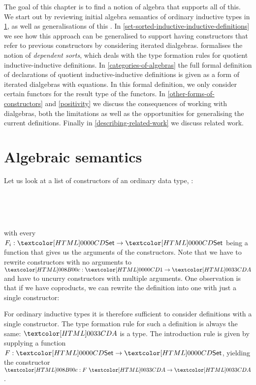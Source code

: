 The goal of this chapter is to find a notion of algebra that supports
all of this. We start out by reviewing initial algebra semantics of
ordinary inductive types in \cref{algebraic-semantics}, as well as
generalisations of this . In
\cref{set-sorted-inductive-inductive-definitions} we see how this
approach can be generalised to support having constructors that refer
to previous constructors by considering iterated
dialgebras.  formalises the notion of
\emph{dependent sorts}, which deals with the type formation rules for
quotient inductive-inductive definitions. In
\cref{categories-of-algebras} the full formal definition of
declarations of quotient inductive-inductive definitions is given as a
form of iterated dialgebras with equations. In this formal definition,
we only consider certain functors for the result type of the
functors. In \cref{other-forms-of-constructors} and \cref{positivity}
we discuss the consequences of working with dialgebras, both the
limitations as well as the opportunities for generalising the current
definitions. Finally in \cref{describing-related-work} we discuss
related work.

\section{Algebraic semantics}
\label{algebraic-semantics}

Let us look at a list of constructors of an ordinary data type, \eg:
%
\begin{datatype}{\Aty}{\Set}
   \\
   \\
  \constrdots \\
\end{datatype}
%
with every $F_i : \Set \to \Set$ being a function that gives us the
arguments of the constructors. Note that we have to rewrite
constructors with no arguments to $\Ac : \unitty \to \Aty$ and have to
uncurry constructors with multiple arguments. One observation is that
if we have coproducts, we can rewrite the definition into one with
just a single constructor:
%
\begin{datatype}{\Aty}{\Set}
\end{datatype}
%
For ordinary inductive types it is therefore sufficient to consider
definitions with a single constructor. The type formation rule for
such a definition is always the same: $\Aty$ is a type. The
introduction rule is given by supplying a function
$F : \Set \to \Set$, yielding the constructor
$\Ac : F\ \Aty \to \Aty$.

